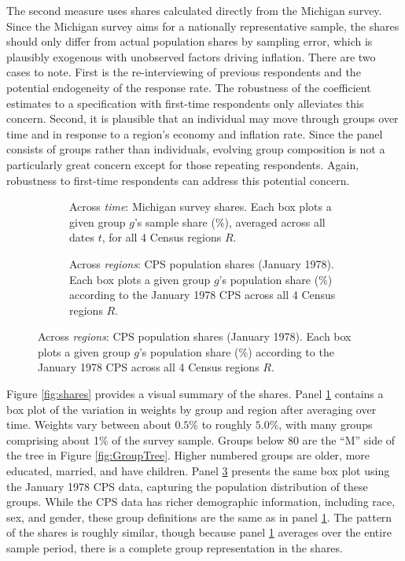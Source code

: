 \documentclass[12pt]{article}
\begin{document}
The second measure uses shares calculated directly from the Michigan survey. Since the Michigan survey aims for a nationally representative sample, the shares should only differ from actual population shares by sampling error, which is plausibly exogenous with unobserved factors driving inflation. There are two cases to note. First is the re-interviewing of previous respondents and the potential endogeneity of the response rate. The robustness of the coefficient estimates to a specification with first-time respondents only alleviates this concern. Second, it is plausible that an individual may move through groups over time and in response to a region's economy and inflation rate. Since the panel consists of groups rather than individuals, evolving group composition is not a particularly great concern except for those repeating respondents. Again, robustness to first-time respondents can address this potential concern.

\begin{figure}
\centering
\caption{Calculated group shares.}\label{fig:shares}
\begin{subfigure}[t]{\textwidth}
\centering

\caption{Across \emph{time}: Michigan survey shares. Each box plots a given group $g$'s sample share ($\%$), averaged across all dates $t$, for all 4 Census regions $R$.}\label{subfig:shares:group}
\end{subfigure}
\quad
\begin{subfigure}[t]{\textwidth}
\centering

\caption{Across \emph{regions}: CPS population shares (January 1978). Each box plots a given group $g$'s population share ($\%$) according to the January 1978 CPS across all 4 Census regions $R$.}\label{subfig:shares:cps}
\end{subfigure}
\end{figure}


Figure \ref{fig:shares} provides a visual summary of the shares. Panel \ref{subfig:shares:group} contains a box plot of the variation in weights by group and region after averaging over time. Weights vary between about $0.5\%$ to roughly $5.0\%$, with many groups comprising about 1\% of the survey sample. Groups below 80 are the ``M'' side of the tree in Figure \ref{fig:GroupTree}. Higher numbered groups are older, more educated, married, and have children. Panel \ref{subfig:shares:cps} presents the same box plot using the January 1978 CPS data, capturing the population distribution of these groups. While the CPS data has richer demographic information, including race, sex, and gender, these group definitions are the same as in panel \ref{subfig:shares:group}. The pattern of the shares is roughly similar, though because panel \ref{subfig:shares:group} averages over the entire sample period, there is a complete group representation in the shares.  
\end{document}
